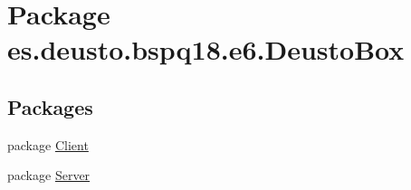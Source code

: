 \hypertarget{namespacees_1_1deusto_1_1bspq18_1_1e6_1_1_deusto_box}{}\section{Package es.\+deusto.\+bspq18.\+e6.\+Deusto\+Box}
\label{namespacees_1_1deusto_1_1bspq18_1_1e6_1_1_deusto_box}
\subsection*{Packages}
\begin{DoxyCompactItemize}
\item 
package \mbox{\hyperlink{namespacees_1_1deusto_1_1bspq18_1_1e6_1_1_deusto_box_1_1_client}{Client}}
\item 
package \mbox{\hyperlink{namespacees_1_1deusto_1_1bspq18_1_1e6_1_1_deusto_box_1_1_server}{Server}}
\end{DoxyCompactItemize}
